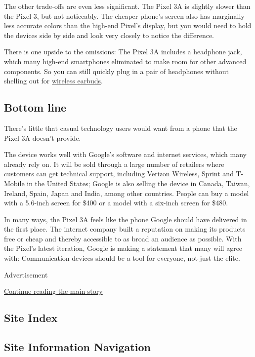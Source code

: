 The other trade-offs are even less significant. The Pixel 3A is slightly
slower than the Pixel 3, but not noticeably. The cheaper phone's screen
also has marginally less accurate colors than the high-end Pixel's
display, but you would need to hold the devices side by side and look
very closely to notice the difference.

There is one upside to the omissions: The Pixel 3A includes a headphone
jack, which many high-end smartphones eliminated to make room for other
advanced components. So you can still quickly plug in a pair of
headphones without shelling out for
\href{https://www.nytimes3xbfgragh.onion/2019/04/03/technology/personaltech/apple-airpods-review.html}{wireless
earbuds}.

\hypertarget{bottom-line}{%
\subsection{Bottom line}\label{bottom-line}}

There's little that casual technology users would want from a phone that
the Pixel 3A doesn't provide.

The device works well with Google's software and internet services,
which many already rely on. It will be sold through a large number of
retailers where customers can get technical support, including Verizon
Wireless, Sprint and T-Mobile in the United States; Google is also
selling the device in Canada, Taiwan, Ireland, Spain, Japan and India,
among other countries. People can buy a model with a 5.6-inch screen for
\$400 or a model with a six-inch screen for \$480.

In many ways, the Pixel 3A feels like the phone Google should have
delivered in the first place. The internet company built a reputation on
making its products free or cheap and thereby accessible to as broad an
audience as possible. With the Pixel's latest iteration, Google is
making a statement that many will agree with: Communication devices
should be a tool for everyone, not just the elite.

Advertisement

\protect\hyperlink{after-bottom}{Continue reading the main story}

\hypertarget{site-index}{%
\subsection{Site Index}\label{site-index}}

\hypertarget{site-information-navigation}{%
\subsection{Site Information
Navigation}\label{site-information-navigation}}

